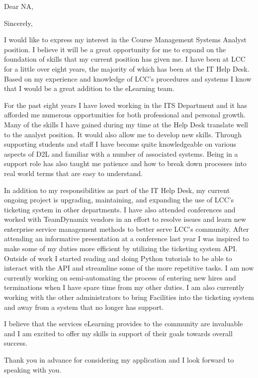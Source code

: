 \date{\today}
\opening{Dear NA,}
\closing{Sincerely,}
\makelettertitle

I would like to express my interest in the Course Management Systems Analyst position.
I believe it will be a great opportunity for me to expand on the foundation of skills
that my current position has given me. I have been at LCC for a little over eight years,
the majority of which has been at the IT Help Desk. Based on my experience and knowledge
of LCC's procedures and systems I know that I would be a great addition to the eLearning team.

For the past eight years I have loved working in the ITS Department and it has afforded me
numerous opportunities for both professional and personal growth. Many of the skills I have
gained during my time at the Help Desk translate well to the analyst position. It would also
allow me to develop new skills. Through supporting students and staff I have become quite
knowledgeable on various aspects of D2L and familiar with a number of associated systems.
Being in a support role has also taught me patience and how to break down processes into
real world terms that are easy to understand.

In addition to my responsibilities as part of the IT Help Desk, my current ongoing
project is upgrading, maintaining, and expanding the use of LCC's ticketing system
in other departments. I have also attended conferences and worked with TeamDynamix
vendors in an effort to resolve issues and learn new enterprise service management
methods to better serve LCC's community. After attending an informative presentation
at a conference last year I was inspired to make some of my duties more efficient by
utilizing the ticketing system API. Outside of work I started reading and doing Python
tutorials to be able to interact with the API and streamline some of the more repetitive
tasks. I am now currently working on semi-automating the process of entering new hires
and terminations when I have spare time from my other duties. I am also currently
working with the other administrators to bring Facilities into the ticketing system
and away from a system that no longer has support.

I believe that the services eLearning provides to the community are invaluable
and I am excited to offer my skills in support of their goals towards overall success.

Thank you in advance for considering my application and I look forward to speaking with you.


\makeletterclosing
